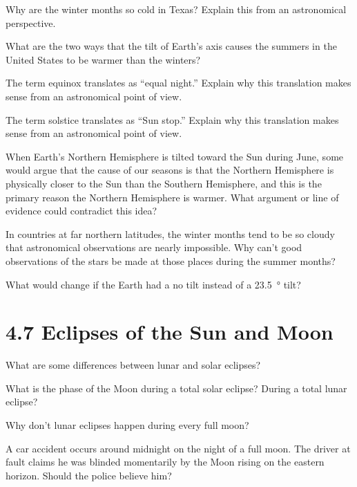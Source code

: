 \documentclass[addpoints]{exam}
\begin{document}
\begin{questions}

\question 
Why are the winter months so cold in Texas? Explain this from an astronomical perspective.
\qspace

\question %
What are the two ways that the tilt of Earth's axis causes the summers in the United States to be warmer than the winters?
\qspace

\question %
The term equinox translates as ``equal night.'' Explain why this translation makes sense from an astronomical point of view.
\qspace

\question %
The term solstice translates as ``Sun stop.'' Explain why this translation makes sense from an astronomical point of view.
\qspace

\question %
When Earth's Northern Hemisphere is tilted toward the Sun during June, some would argue that the cause of our seasons is that the Northern Hemisphere is physically closer to the Sun than the Southern Hemisphere, and this is the primary reason the Northern Hemisphere is warmer. What argument or line of evidence could contradict this idea?
\qspace

\question %
In countries at far northern latitudes, the winter months tend to be so cloudy that astronomical observations are nearly impossible. Why can't good observations of the stars be made at those places during the summer months?
\qspace

\question
What would change if the Earth had a no tilt instead of a \SI{23.5}{\degree} tilt?
\qspace



\section*{4.7 Eclipses of the Sun and Moon}

\question
What are some differences between lunar and solar eclipses?

\question %
What is the phase of the Moon during a total solar eclipse? During a total lunar eclipse?

\question %
Why don't lunar eclipses happen during every full moon?

\question %
A car accident occurs around midnight on the night of a full moon. The driver at fault claims he was blinded momentarily by the Moon rising on the eastern horizon. Should the police believe him?



\end{questions}
\end{document}
